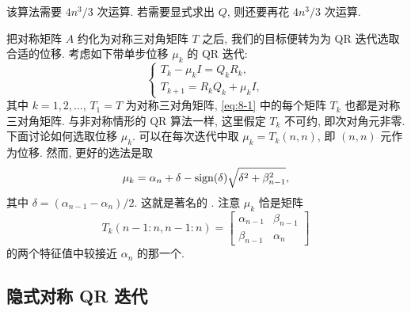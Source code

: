 该算法需要 $4n^3/3$ 次运算. 若需要显式求出 $Q$, 则还要再花 $4n^3/3$ 次运算.

把对称矩阵 $A$ 约化为对称三对角矩阵 $T$ 之后, 我们的目标便转为为 QR 迭代选取合适的位移. 考虑如下带单步位移 $\mu_k$ 的 QR 迭代:
\begin{equation}
  \left\{
  \begin{array}{l}
    T_k-\mu_kI=Q_kR_k,\\
    T_{k+1}=R_kQ_k+\mu_kI,
  \end{array}
  \right.
  \label{eq:8-1}
\end{equation}
其中 $k=1,2,\ldots$, $T_1=T$ 为对称三对角矩阵, \eqref{eq:8-1} 中的每个矩阵 $T_k$ 也都是对称三对角矩阵. 与非对称情形的 QR 算法一样, 这里假定 $T_k$ 不可约, 即次对角元非零. 下面讨论如何选取位移 $\mu_k$. 可以在每次迭代中取 $\mu_k=T_k(n,n)$, 即 $(n,n)$ 元作为位移. 然而, 更好的选法是取
\[
  \mu_k=\alpha_n+\delta-\operatorname{sign}(\delta)\sqrt{\delta^2+\beta_{n-1}^2},
\]
其中 $\delta=(\alpha_{n-1}-\alpha_n)/2$. 这就是著名的  \cite{src:95}. 注意 $\mu_k$ 恰是矩阵
\[
  T_k(n-1:n,n-1:n)=\begin{bmatrix}
    \alpha_{n-1} & \beta_{n-1}\\
    \beta_{n-1} & \alpha_n
  \end{bmatrix}
\]
的两个特征值中较接近 $\alpha_n$ 的那一个.

\subsection{隐式对称 QR 迭代}
\label{sec:8-2-2}

